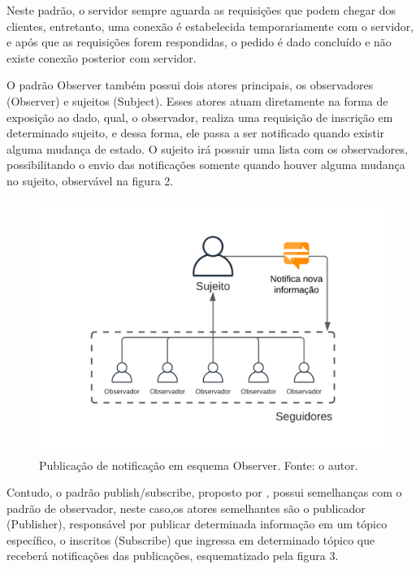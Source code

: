 Neste padrão, o servidor sempre aguarda as requisições que podem chegar dos clientes, entretanto, uma conexão é estabelecida temporariamente com o servidor, e após que as requisições forem respondidas, o pedido é dado concluído e não existe conexão posterior com servidor.\par
O padrão Observer também possui dois atores principais, os observadores (Observer) e sujeitos (Subject). Esses atores atuam diretamente na forma de exposição ao dado, qual, o observador, realiza uma requisição de inscrição em determinado sujeito, e dessa forma, ele passa a ser notificado quando existir alguma mudança de estado. O sujeito irá possuir uma lista com os observadores, possibilitando o envio das notificações somente quando houver alguma mudança no sujeito, observável na figura 2.\par

\begin{figure}[H]
    \centering
	\includegraphics[scale=0.98]{topics/observer.png}
	\caption{Publicação de notificação em esquema Observer. Fonte: o autor.}
	\label{fig:observer}
\end{figure}

Contudo, o padrão publish/subscribe, proposto por \cite{Birman1987}, possui semelhanças com o padrão de observador, neste caso,os atores semelhantes são o publicador (Publisher), responsável por publicar determinada informação em um tópico específico, o inscritos (Subscribe) que ingressa em determinado tópico que receberá notificações das publicações, esquematizado pela figura 3.\par

